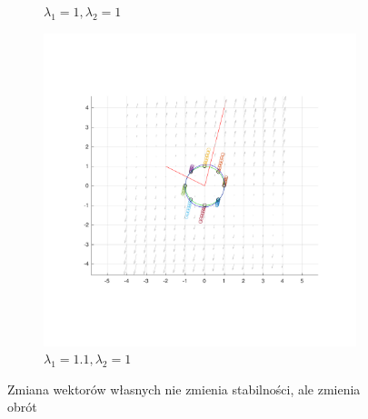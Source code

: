 \documentclass[]{article}
\begin{document}
\begin{figure}[H]
\begin{subfigure}{.5\textwidth}
		\caption{$\lambda_1 = 1, \lambda_2 = 1 $}
		\label{fig:const22}
	\end{subfigure}%
	\begin{subfigure}{.5\textwidth}
		\centering
		\includegraphics[width=0.99\linewidth]{const2_11}
		\caption{$\lambda_1 = 1.1, \lambda_2 = 1 $}
		\label{fig:const23}
	\end{subfigure}%
	\caption{Zmiana wektorów własnych nie zmienia stabilności, ale zmienia obrót}
	\label{figconst}
\end{figure}
\end{document}
